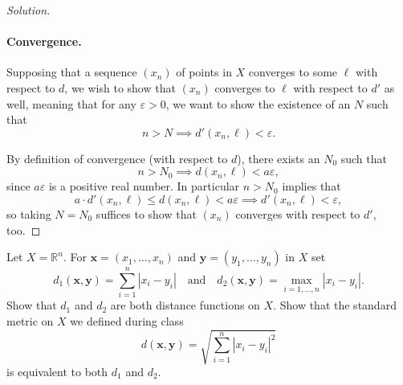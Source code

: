 \documentclass[11pt]{scrartcl}
\providecommand{\eps}{\varepsilon}
\providecommand{\RR}{\mathbb R}
\theoremstyle{problem}
\newenvironment{problem}[1]
{\renewcommand\theinnercustomthm{#1}\innercustomthm}
{\endinnercustomthm}
\theoremstyle{remark}
\newenvironment{soln}{\begin{proof}[Solution]}{\end{proof}}
\begin{document}
\begin{soln}
	\paragraph{Convergence.}
	Supposing that a sequence $(x_n)$ of points in $X$
	converges to some $\ell$ with respect to $d$, we wish to show that
	$(x_n)$ converges to $\ell$ with respect to $d'$ as well,
	meaning that for any $\eps > 0$,
	we want to show the existence of an $N$ such that
	\[n > N \implies d'(x_n, \ell) < \eps.\]
	
	By definition of convergence (with respect to $d$),
	there exists an $N_0$ such that
	\[n > N_0 \implies d(x_n, \ell) < a\eps,\]
	since $a\eps$ is a positive real number.
	In particular $n > N_0$ implies that
	\[a\cdot d'(x_n, \ell) \le d(x_n, \ell) < a\eps \implies
	d'(x_n, \ell) < \eps,\]
	so taking $N = N_0$ suffices to show that
	$(x_n)$ converges with respect to $d'$, too.
\end{soln}

\begin{problem}{5}
	Let $X = \RR^n$. For $\mathbf x = (x_1, \dots, x_n)$
	and $\mathbf y = (y_1, \dots, y_n)$ in $X$ set
	\[d_1(\mathbf x, \mathbf y) = \sum_{i=1}^n |x_i - y_i|
	\quad\text{and}\quad
	d_2(\mathbf x, \mathbf y) = \max_{i=1, \dots, n}|x_i - y_i|.\]
	Show that $d_1$ and $d_2$ are both distance functions on $X$.
	Show that the standard metric on $X$ we defined during class
	\[d(\mathbf x,\mathbf y) = \sqrt{\sum_{i=1}^n |x_i - y_i|^2}\]
	is equivalent to both $d_1$ and $d_2$.
\end{problem}
\end{document}
